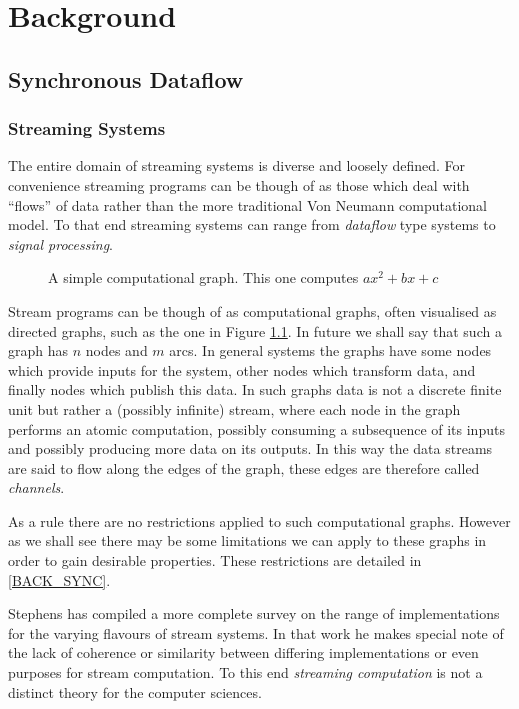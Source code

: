 \chapter{Background}
\section{Synchronous Dataflow}

\subsection{Streaming Systems}
The entire domain of streaming systems is diverse and loosely defined.
For convenience streaming programs can be though of as those which deal with ``flows'' of data rather than the more traditional Von Neumann computational model.
To that end streaming systems can range from {\em dataflow} type systems to {\em signal processing}.

\begin{figure}
\begin{center}
	
\caption{A simple computational graph.  This one computes $ax^2 + bx + c$}
\label{figSimpleDG}
\end{center}
\end{figure}

Stream programs can be though of as computational graphs, often visualised as directed graphs, such as the one in Figure \ref{figSimpleDG}.
In future we shall say that such a graph has $n$ nodes and $m$ arcs.
In general systems the graphs have some nodes which provide inputs for the system, other nodes which transform data, and finally nodes which publish this data.
In such graphs data is not a discrete finite unit but rather a (possibly infinite) stream, where each node in the graph performs an atomic computation, possibly consuming a subsequence of its inputs and possibly producing more data on its outputs.
In this way the data streams are said to flow along the edges of the graph, these edges are therefore called {\em channels}.

As a rule there are no restrictions applied to such computational graphs.
However as we shall see there may be some limitations we can apply to these graphs in order to gain desirable properties.
These restrictions are detailed in \ref{BACK_SYNC}.

Stephens has compiled a more complete survey \cite{ste97} on the range of implementations for the varying flavours of stream systems.
In that work he makes special note of the lack of coherence or similarity between differing implementations or even purposes for stream computation.
To this end {\em streaming computation} is not a distinct theory for the computer sciences.

